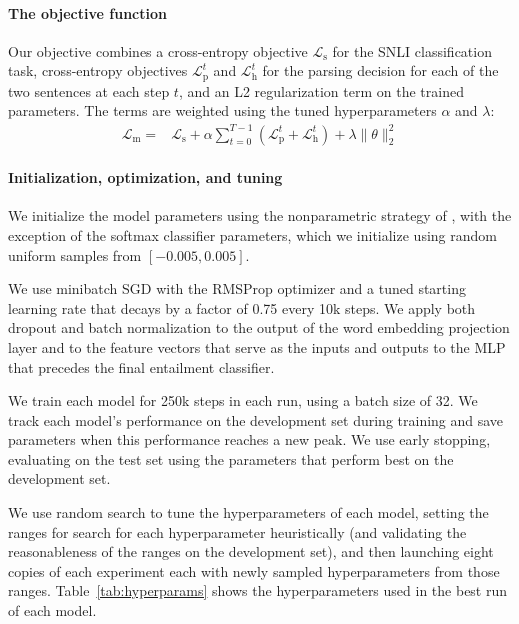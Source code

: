 \documentclass[11pt]{article}
\providecommand{\norm}[1]{\lVert#1\rVert}
\begin{document}
\paragraph{The objective function} Our objective combines a cross-entropy objective $\mathcal{L}_{\text{s}}$ for the SNLI classification task, cross-entropy objectives $\mathcal{L}^t_{\text{p}}$ and $\mathcal{L}^t_{\text{h}}$ for the parsing decision for each of the two sentences at each step $t$, and an L2 regularization term on the trained parameters. The terms are weighted using the tuned hyperparameters $\alpha$ and $\lambda$:
\begin{equation}
\begin{split}
\mathcal{L}_{\text{m}} = &\mathcal{L}_{\text{s}} + \alpha \sum_{t=0}^{T-1} (\mathcal{L}^t_{\text{p}} + \mathcal{L}^t_{\text{h}}) + \lambda \norm{\theta}^2_2
\end{split}
\end{equation}

\paragraph{Initialization, optimization, and tuning}

We initialize the model parameters using the nonparametric strategy of \citet{DBLP:journals/corr/HeZR015}, with the exception of the softmax classifier parameters, which we initialize using random uniform samples from $[-0.005, 0.005]$.
 
We use minibatch SGD with the RMSProp optimizer \citep{tieleman2012lecture} and a tuned starting learning rate that decays by a factor of 0.75 every 10k steps. We apply both dropout \citep{srivastava2014dropout} and batch normalization \citep{2015SIoffeCSzegedy} to the output of the word embedding projection layer and to the feature vectors that serve as the inputs and outputs to the MLP that precedes the final entailment classifier.

We train each model for 250k steps in each run, using a batch size of 32. We track each model's performance on the development set during training and save parameters when this performance reaches a new peak. We use early stopping, evaluating on the test set using the parameters that perform best on the development set.

We use random search to tune the hyperparameters of each model, setting the ranges for search for each hyperparameter heuristically (and validating the reasonableness of the ranges on the development set), and then launching eight copies of each experiment each with newly sampled hyperparameters from those ranges. Table~\ref{tab:hyperparams} shows the hyperparameters used in the best run of each model.
\end{document}
